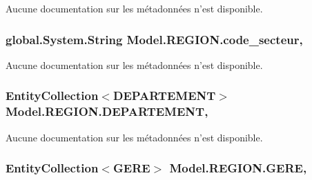 Aucune documentation sur les métadonnées n'est disponible. 

\hypertarget{class_model_1_1_r_e_g_i_o_n_a8a17b4d46de541201536619d69596c90}{
\subsubsection[{code\-\_\-secteur}]{\setlength{\rightskip}{0pt plus 5cm}global.\-System.\-String Model.\-R\-E\-G\-I\-O\-N.\-code\-\_\-secteur\hspace{0.3cm}{\ttfamily [get]}, {\ttfamily [set]}}}\label{class_model_1_1_r_e_g_i_o_n_a8a17b4d46de541201536619d69596c90}


Aucune documentation sur les métadonnées n'est disponible. 

\hypertarget{class_model_1_1_r_e_g_i_o_n_a4c03f8b282035bb407ba160cd96ea51f}{
\subsubsection[{D\-E\-P\-A\-R\-T\-E\-M\-E\-N\-T}]{\setlength{\rightskip}{0pt plus 5cm}Entity\-Collection$<${\bf D\-E\-P\-A\-R\-T\-E\-M\-E\-N\-T}$>$ Model.\-R\-E\-G\-I\-O\-N.\-D\-E\-P\-A\-R\-T\-E\-M\-E\-N\-T\hspace{0.3cm}{\ttfamily [get]}, {\ttfamily [set]}}}\label{class_model_1_1_r_e_g_i_o_n_a4c03f8b282035bb407ba160cd96ea51f}


Aucune documentation sur les métadonnées n'est disponible. 

\hypertarget{class_model_1_1_r_e_g_i_o_n_a331f4581a87b7e6d2b23377530395efa}{
\subsubsection[{G\-E\-R\-E}]{\setlength{\rightskip}{0pt plus 5cm}Entity\-Collection$<${\bf G\-E\-R\-E}$>$ Model.\-R\-E\-G\-I\-O\-N.\-G\-E\-R\-E\hspace{0.3cm}{\ttfamily [get]}, {\ttfamily [set]}}}\label{class_model_1_1_r_e_g_i_o_n_a331f4581a87b7e6d2b23377530395efa}


